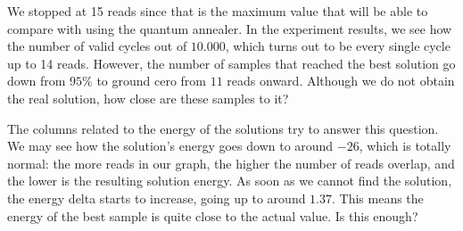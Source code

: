\begin{table}[H]
	\centering
	\caption{Results of experiment 5, $10.000$ reads using the simulated annealer.}
	\label{tab:exp5_1}
\end{table}

We stopped at 15 reads since that is the maximum value that will be able to compare with using the quantum annealer. In the experiment results, we see how the number of valid cycles out of $10.000$, which turns out to be every single cycle up to 14 reads. However, the number of samples that reached the best solution go down from $95\%$ to ground cero from $11$ reads onward. Although we do not obtain the real solution, how close are these samples to it? 

The columns related to the energy of the solutions try to answer this question. We may see how the solution's energy goes down to around $-26$, which is totally normal: the more reads in our graph, the higher the number of reads overlap, and the lower is the resulting solution energy. As soon as we cannot find the solution, the energy delta starts to increase, going up to around $1.37$. This means the energy of the best sample is quite close to the actual value. Is this enough?

